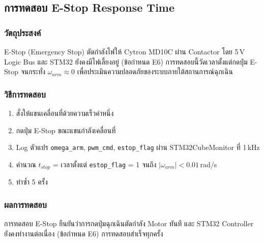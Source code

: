 \subsection{การทดสอบ E-Stop Response Time}
\label{subsec:estop_test}

\subsubsection{วัตถุประสงค์}

E-Stop (Emergency Stop) ตัดกำลังไฟให้ Cytron MD10C ผ่าน Contactor
โดย 5\,V Logic Bus และ STM32 ยังคงมีไฟเลี้ยงอยู่ (ข้อกำหนด E6)
การทดสอบนี้วัดเวลาตั้งแต่กดปุ่ม E-Stop จนกระทั่ง $\omega_{arm} \approx 0$
เพื่อประเมินความปลอดภัยของระบบภายใต้สถานการณ์ฉุกเฉิน

\subsubsection{วิธีการทดสอบ}

\begin{enumerate}
    \item สั่งให้แขนเคลื่อนที่ด้วยความเร็วค่าหนึ่ง
    \item กดปุ่ม E-Stop ขณะแขนกำลังเคลื่อนที่
    \item Log ตัวแปร \texttt{omega\_arm}, \texttt{pwm\_cmd}, \texttt{estop\_flag}
          ผ่าน STM32CubeMonitor ที่ 1\,kHz
    \item คำนวณ $t_{stop}$ = เวลาตั้งแต่ \texttt{estop\_flag} = 1
          จนถึง $|\omega_{arm}| < 0.01$\,rad/s
    \item ทำซ้ำ 5 ครั้ง
\end{enumerate}

\subsubsection{ผลการทดสอบ}

\noindent การทดสอบ E-Stop ยืนยันว่าการกดปุ่มฉุกเฉินตัดกำลัง Motor ทันที
และ STM32 Controller ยังคงทำงานต่อเนื่อง (ข้อกำหนด E6) การทดสอบสำเร็จทุกครั้ง


